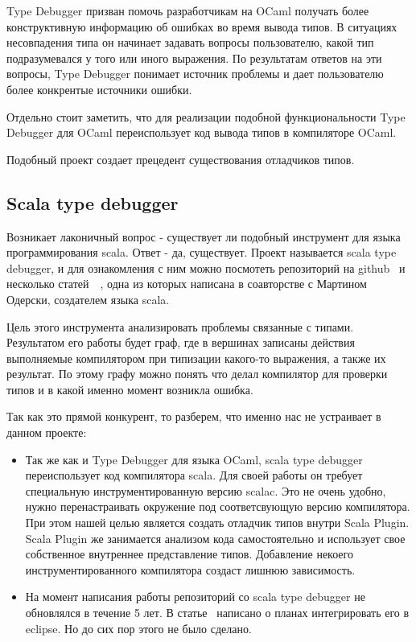 Type Debugger призван помочь разработчикам на OCaml получать более
конструктивную информацию об ошибках во время вывода типов.
В ситуациях несовпадения типа он начинает задавать
вопросы пользователю, какой тип подразумевался у того или иного выражения.
По результатам ответов на эти вопросы, Type Debugger понимает источник проблемы
и дает пользователю более конкрентые источники ошибки.

Отдельно стоит заметить, что для реализации подобной функциональности
Type Debugger для OCaml переиспользует код вывода типов в компиляторе OCaml.

Подобный проект создает прецедент существования отладчиков типов.

\subsection{Scala type debugger}
\label{sec:typeDebugger}

Возникает лаконичный вопрос - существует ли подобный инструмент для языка
программирования scala.
Ответ - да, существует.
Проект называется scala type debugger, и для ознакомления с ним можно посмотеть
репозиторий на github~\cite{type_debugger_github} и несколько
статей~\cite{type_debugger1}~\cite{type_debugger2}, одна из которых
написана в соавторстве с Мартином Одерски, создателем языка scala.

Цель этого инструмента анализировать проблемы связанные с типами.
Результатом его работы будет граф, где в вершинах записаны действия выполняемые
компилятором при типизации какого-то выражения, а также их результат.
По этому графу можно понять что делал компилятор для проверки типов и
в какой именно момент возникла ошибка.

Так как это прямой конкурент, то разберем, что именно нас не устраивает в данном
проекте:
\begin{itemize}
  \item Так же как и Type Debugger для языка OCaml, scala type debugger
  переиспользует код компилятора scala.
  Для своей работы он требует специальную инструментированную версию scalac.
  Это не очень удобно, нужно перенастраивать окружение под соответсвующую версию
  компилятора.
  При этом нашей целью является создать отладчик типов внутри Scala Plugin.
  Scala Plugin же занимается анализом кода самостоятельно и использует
  свое собственное внутреннее представление типов.
  Добавление некоего инструментированного компилятора создаст лишнюю зависимость.
  \item На момент написания работы репозиторий со scala type debugger не
  обновлялся в течение 5 лет.
  В статье~\cite{type_debugger1} написано о планах интегрировать его в eclipse.
  Но до сих пор этого не было сделано.
\end{itemize}


